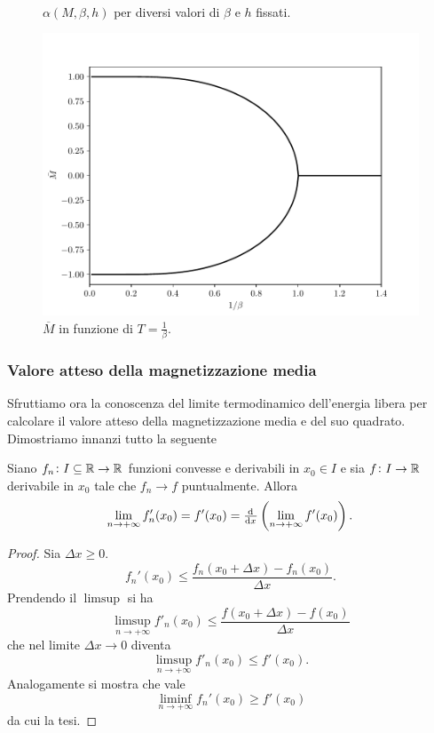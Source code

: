 \iffigureon
\begin{figure}[p]
    \centering
    \subfloat{}
    \subfloat{} \\
    \subfloat{}
    \subfloat{}
    \caption{$ \alpha(M,\beta,h) $ per diversi valori di $ \beta $ e $ h $ fissati.}
    \label{fig:alpha}
\end{figure}
\begin{figure}[p]
    \centering
    \includegraphics[scale=0.8]{img/cw/transizione.pdf}
    \caption{$ \overline{M} $ in funzione di $ T = \frac{1}{\beta}$.}
    \label{fig:transizione}
\end{figure}
\fi

\subsubsection{Valore atteso della magnetizzazione media}
Sfruttiamo ora la conoscenza del limite termodinamico dell'energia libera per calcolare il valore atteso della magnetizzazione media e del suo quadrato. Dimostriamo innanzi tutto la seguente
\begin{proposition}
    Siano $ f_n\colon I\subseteq\mathbb{R} \to \mathbb{R} $ funzioni convesse e derivabili in $ x_0 \in I $ e sia $ f\colon I\to\mathbb{R} $ derivabile in $ x_0 $ tale che $ f_n \to f $ puntualmente. Allora
    \[ \lim_{n \to +\infty} f_n'(x_0) = f'(x_0) = \od{}{x} \left( \lim_{n \to +\infty} f'(x_0) \right). \]
\end{proposition}
\begin{proof}\label{prop:convessascambio}
    Sia $ \Delta x \geq 0 $.
    \[ f_n'(x_0) \leq \frac{f_n(x_0+\Delta x)-f_n(x_0)}{\Delta x}. \]
    Prendendo il $ \limsup $ si ha
    \[ \limsup_{n\to +\infty} f'_n(x_0) \leq \frac{f(x_0+\Delta x)-f(x_0)}{\Delta x} \]
    che nel limite $ \Delta x \to 0 $ diventa
    \[ \limsup_{n\to +\infty} f'_n(x_0) \leq f'(x_0). \]
    Analogamente si mostra che vale
    \[ \liminf_{n\to +\infty} f_n'(x_0) \geq f'(x_0) \]
    da cui la tesi.
\end{proof}

